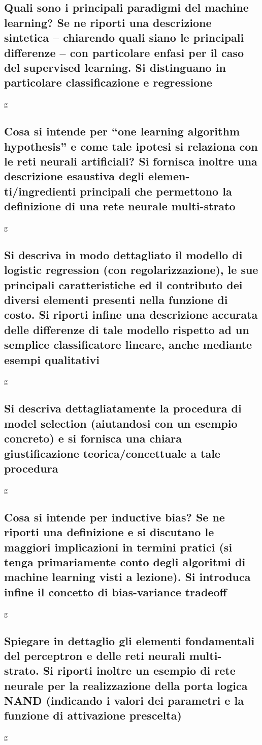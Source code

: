 \documentclass[10pt,oneside,a4paper]{article}
\begin{document}
\subsection{Quali sono i principali paradigmi del machine learning? Se ne riporti una descrizione
	sintetica – chiarendo quali siano le principali differenze – con particolare enfasi per il caso
	del supervised learning. Si distinguano in particolare classificazione e regressione}
g
\subsection{Cosa si intende per “one learning algorithm hypothesis” e come tale ipotesi si relaziona
	con le reti neurali artificiali? Si fornisca inoltre una descrizione esaustiva degli elemen-
	ti/ingredienti principali che permettono la definizione di una rete neurale multi-strato}
g
\subsection{Si descriva in modo dettagliato il modello di logistic regression (con regolarizzazione), le
	sue principali caratteristiche ed il contributo dei diversi elementi presenti nella funzione
	di costo. Si riporti infine una descrizione accurata delle differenze di tale modello rispetto
	ad un semplice classificatore lineare, anche mediante esempi qualitativi}
g
\subsection{Si descriva dettagliatamente la procedura di model selection (aiutandosi con un esempio
	concreto) e si fornisca una chiara giustificazione teorica/concettuale a tale procedura}
g
\subsection{Cosa si intende per inductive bias? Se ne riporti una definizione e si discutano le maggiori
	implicazioni in termini pratici (si tenga primariamente conto degli algoritmi di machine
	learning visti a lezione). Si introduca infine il concetto di bias-variance tradeoff}
g
\subsection{Spiegare in dettaglio gli elementi fondamentali del perceptron e delle reti neurali multi-
	strato. Si riporti inoltre un esempio di rete neurale per la realizzazione della porta logica
	NAND (indicando i valori dei parametri e la funzione di attivazione prescelta)}
g
\end{document}
